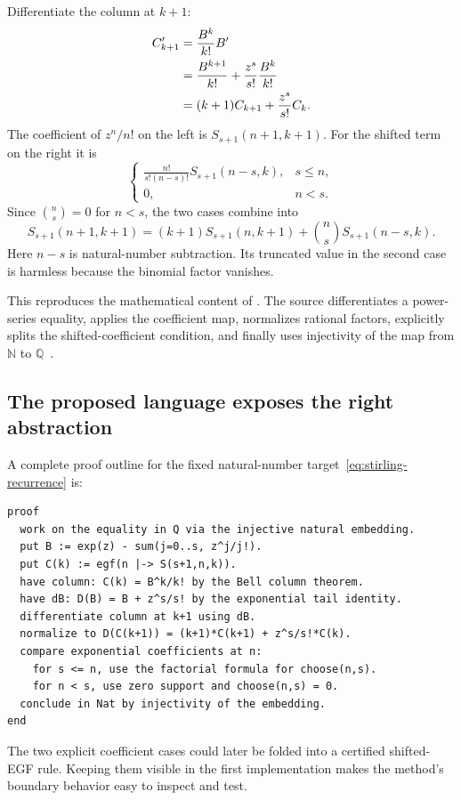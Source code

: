 \documentclass[11pt,a4paper]{article}
\newcommand{\N}{\mathbb N}
\newcommand{\Q}{\mathbb Q}
\theoremstyle{remark}
\begin{document}
Differentiate the column at $k+1$:
\begin{align}
C_{k+1}'
&=\frac{B^k}{k!}B'\notag\\
&=\frac{B^{k+1}}{k!}+\frac{z^s}{s!}\frac{B^k}{k!}\notag\\
&=(k+1)C_{k+1}+\frac{z^s}{s!}C_k.
\label{eq:stirling-diff}
\end{align}
The coefficient of $z^n/n!$ on the left is $S_{s+1}(n+1,k+1)$. For the shifted term on the right it is
\begin{equation}
\begin{cases}
\displaystyle \frac{n!}{s!(n-s)!}S_{s+1}(n-s,k),&s\le n,\\[2mm]
0,&n<s.
\end{cases}
\label{eq:stirling-boundary}
\end{equation}
Since $\binom ns=0$ for $n<s$, the two cases combine into
\begin{equation}
S_{s+1}(n+1,k+1)
=(k+1)S_{s+1}(n,k+1)
+\binom ns S_{s+1}(n-s,k).
\label{eq:stirling-recurrence}
\end{equation}
Here $n-s$ is natural-number subtraction. Its truncated value in the second case is harmless because the binomial factor vanishes.

This reproduces the mathematical content of . The source differentiates a power-series equality, applies the coefficient map, normalizes rational factors, explicitly splits the shifted-coefficient condition, and finally uses injectivity of the map from $\N$ to $\Q$~\cite{proveit-stirling}.

\subsection{The proposed language exposes the right abstraction}

A complete proof outline for the fixed natural-number target~\eqref{eq:stirling-recurrence} is:
\begin{lstlisting}[caption={The boundary convention is part of the coefficient method's contract.}]
proof
  work on the equality in Q via the injective natural embedding.
  put B := exp(z) - sum(j=0..s, z^j/j!).
  put C(k) := egf(n |-> S(s+1,n,k)).
  have column: C(k) = B^k/k! by the Bell column theorem.
  have dB: D(B) = B + z^s/s! by the exponential tail identity.
  differentiate column at k+1 using dB.
  normalize to D(C(k+1)) = (k+1)*C(k+1) + z^s/s!*C(k).
  compare exponential coefficients at n:
    for s <= n, use the factorial formula for choose(n,s).
    for n < s, use zero support and choose(n,s) = 0.
  conclude in Nat by injectivity of the embedding.
end
\end{lstlisting}
The two explicit coefficient cases could later be folded into a certified shifted-EGF rule. Keeping them visible in the first implementation makes the method's boundary behavior easy to inspect and test.
\end{document}
